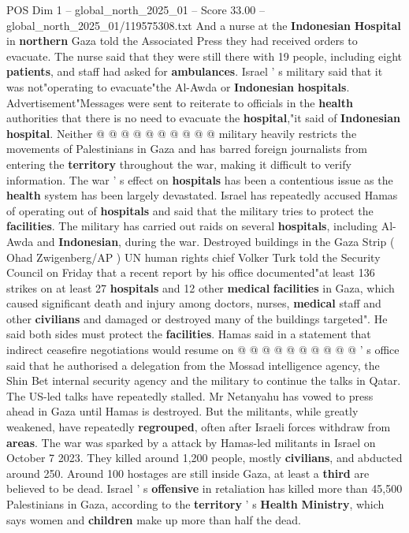 \begin{textsample}{POS Dim 1 – global\_north\_2025\_01 – Score 33.00 – global\_north\_2025\_01/119575308.txt}
And a nurse at the \textbf{Indonesian} \textbf{Hospital} in \textbf{northern} Gaza told the Associated Press they had received orders to evacuate.
The nurse said that they were still there with 19 people, including eight \textbf{patients}, and staff had asked for \textbf{ambulances}.
Israel ' s military said that it was not"operating to evacuate"the Al-Awda or \textbf{Indonesian} \textbf{hospitals}.
Advertisement"Messages were sent to reiterate to officials in the \textbf{health} authorities that there is no need to evacuate the \textbf{hospital},"it said of \textbf{Indonesian} \textbf{hospital}.
Neither @ @ @ @ @ @ @ @ @ @ military heavily restricts the movements of Palestinians in Gaza and has barred foreign journalists from entering the \textbf{territory} throughout the war, making it difficult to verify information.
The war ' s effect on \textbf{hospitals} has been a contentious issue as the \textbf{health} system has been largely devastated.
Israel has repeatedly accused Hamas of operating out of \textbf{hospitals} and said that the military tries to protect the \textbf{facilities}.
The military has carried out raids on several \textbf{hospitals}, including Al-Awda and \textbf{Indonesian}, during the war.
Destroyed buildings in the Gaza Strip ( Ohad Zwigenberg/AP ) UN human rights chief Volker Turk told the Security Council on Friday that a recent report by his office documented"at least 136 strikes on at least 27 \textbf{hospitals} and 12 other \textbf{medical} \textbf{facilities} in Gaza, which caused significant death and injury among doctors, nurses, \textbf{medical} staff and other \textbf{civilians} and damaged or destroyed many of the buildings targeted".
He said both sides must protect the \textbf{facilities}.
Hamas said in a statement that indirect ceasefire negotiations would resume on @ @ @ @ @ @ @ @ @ @ ' s office said that he authorised a delegation from the Mossad intelligence agency, the Shin Bet internal security agency and the military to continue the talks in Qatar.
The US-led talks have repeatedly stalled.
Mr Netanyahu has vowed to press ahead in Gaza until Hamas is destroyed.
But the militants, while greatly weakened, have repeatedly \textbf{regrouped}, often after Israeli forces withdraw from \textbf{areas}.
The war was sparked by a attack by Hamas-led militants in Israel on October 7 2023.
They killed around 1,200 people, mostly \textbf{civilians}, and abducted around 250.
Around 100 hostages are still inside Gaza, at least a \textbf{third} are believed to be dead.
Israel ' s \textbf{offensive} in retaliation has killed more than 45,500 Palestinians in Gaza, according to the \textbf{territory} ' s \textbf{Health} \textbf{Ministry}, which says women and \textbf{children} make up more than half the dead.

\end{textsample}
